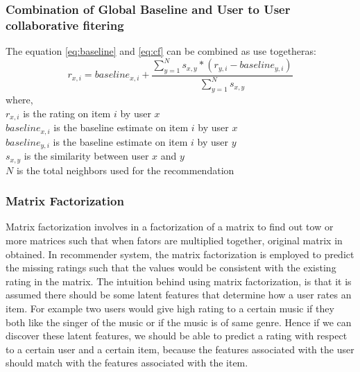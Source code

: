 \subsubsection{Combination of Global Baseline and User to User collaborative fitering}
The equation \ref{eq:baseline} and \ref{eq:cf} can be combined as use togetheras:
\begin{equation}
	r_{x,i} = baseline_{x,i}+\frac{\sum_{y=1}^N s_{x,y}*(r_{y,i}-baseline_{y,i})}{\sum_{y=1}^N s_{x,y}}
\end{equation}
where,\\
$r_{x,i}$ is the rating on item $i$ by user $x$ \\
$baseline_{x,i}$ is the baseline estimate on item $i$ by user $x$ \\
$baseline_{y,i}$ is the baseline estimate on item $i$ by user $y$ \\
$s_{x,y}$ is the similarity between user $x$ and $y$ \\
$N$ is the total neighbors used for the recommendation
\subsubsection{Matrix Factorization}
Matrix factorization \cite{latent} involves in a factorization of a matrix to find out tow or more matrices such that when fators are multiplied together, original matrix in obtained. In recommender system, the matrix factorization is employed to predict the missing ratings such that the values would be consistent with the existing rating in the matrix. The intuition behind using matrix factorization, is that it is assumed there should be some latent features that determine how a user rates an item. For example two users would give high rating to a certain music if they both like the singer of the music or if the music is of same genre. Hence if we can discover these latent features, we should be able to predict a rating with respect to a certain user and a certain item, because the features associated with the user should match with the features associated with the item.

